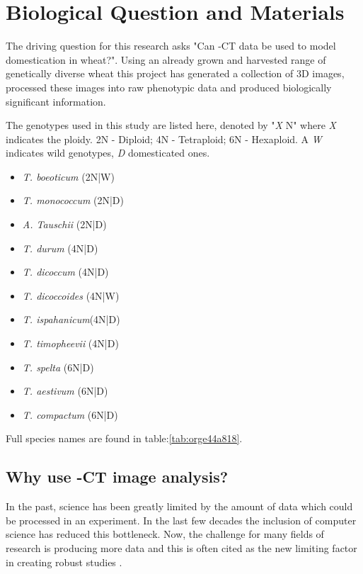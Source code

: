 \documentclass[11pt]{report}
\begin{document}
\section{Biological Question and Materials}
\label{sec:orgad5e9b3}

The driving question for this research asks "Can \textmu{}-CT data be used to model domestication in wheat?". Using an already grown and harvested range of genetically diverse wheat this project has generated a collection of 3D images, processed these images into raw phenotypic data and produced biologically significant information.

The genotypes used in this study are listed here, denoted by "\emph{X} N" where \emph{X} indicates the ploidy. 2N - Diploid; 4N - Tetraploid; 6N - Hexaploid. A \emph{W} indicates wild genotypes, \emph{D} domesticated ones.

\begin{multicols}{3}

  \begin{itemize}
  \item{\textit{T. boeoticum} (2N|W)}
  \item{\textit{T. monococcum} (2N|D)}
  \item{\textit{A. Tauschii} (2N|D)}
  \end{itemize}

  \columnbreak

  \begin{itemize}
  \item{\textit{T. durum} (4N|D)}
  \item{\textit{T. dicoccum} (4N|D)}
  \item{\textit{T. dicoccoides} (4N|W)}
  \item{\textit{T. ispahanicum}(4N|D)}
  \item{\textit{T. timopheevii} (4N|D)}
  \end{itemize}

  \columnbreak

  \begin{itemize}
  \item{\textit{T. spelta} (6N|D)}
  \item{\textit{T. aestivum} (6N|D)}
  \item{\textit{T. compactum} (6N|D)}
  \end{itemize}

\end{multicols}
Full species names are found in table:\ref{tab:orge44a818}.

\subsection{Why use \textmu{}-CT image analysis?}
\label{sec:orgadd4a12}
In the past, science has been greatly limited by the amount of data which could be processed in an experiment. In the last few decades the inclusion of computer science has reduced this bottleneck. Now, the challenge for many fields of research is producing more data and this is often cited as the new limiting factor in creating robust studies \cite{Furbank2011}.
\end{document}
